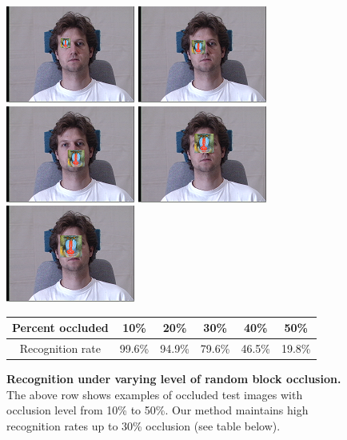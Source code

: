 \documentclass[12pt,journal,draftcls,letterpaper,onecolumn]{IEEEtran}
\begin{document}
\begin{figure}[t]
\centering
\includegraphics[scale=0.75,clip=true]{figures_pami/multipie_occ/occ10.png}
\includegraphics[scale=0.75,clip=true]{figures_pami/multipie_occ/occ20.png}
\includegraphics[scale=0.75,clip=true]{figures_pami/multipie_occ/occ30.png}
\includegraphics[scale=0.75,clip=true]{figures_pami/multipie_occ/occ40.png}
\includegraphics[scale=0.75,clip=true]{figures_pami/multipie_occ/occ50.png}
\caption{{\bf Recognition under varying level of
random block occlusion.} The above row shows examples of occluded test images with occlusion level from 10\% to 50\%. Our method maintains high recognition rates up to 30\% occlusion (see table below). }
\begin{tabular}{|c|c|c|c|c|c| }
\hline
Percent occluded & 10\% & 20\% & 30\% & 40\% & 50\%  \\
\hline
\hline
Recognition rate & 99.6\% & 94.9\% & 79.6\% & 46.5\% & 19.8\% \\
\hline
\end{tabular}
\label{fig:multipie-occ-rec}
\vspace{-.5in}
\end{figure}
\end{document}
